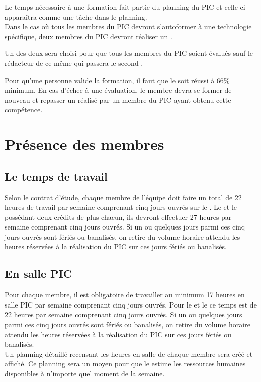 Le temps nécessaire à une formation fait partie du planning du PIC et celle-ci apparaîtra comme une tâche dans le planning. \\

Dans le cas où tous les membres du PIC devront s'autoformer à une technologie spécifique, deux membres du PIC devront réaliser un \QCM.

Un des deux \QCMCourt{} sera choisi pour que tous les membres du PIC soient évalués sauf le rédacteur de ce même \QCMCourt{} qui passera le second \QCMCourt.

Pour qu'une personne valide la formation, il faut que le \QCMCourt{} soit réussi à 66\% minimum. En cas d'échec à une évaluation, le membre devra se former de nouveau et repasser un \QCMCourt{} réalisé par un membre du PIC ayant obtenu cette compétence.

\section{Présence des membres}
\label{Présence des membres}

\subsection{Le temps de travail}
\label{temps_de_travail}
Selon le contrat d'étude, chaque membre de l'équipe doit faire un total de 22 heures de travail par semaine comprenant cinq jours ouvrés sur le \PICCourt. Le \CP{} et le \RQ{} possédant deux crédits de plus chacun, ils devront effectuer 27 heures par semaine comprenant cinq jours ouvrés. Si un ou quelques jours parmi ces cinq jours ouvrés sont fériés ou banalisés, on retire du volume horaire attendu les heures réservées à la réalisation du PIC sur ces jours fériés ou banalisés.

\subsection{En salle PIC}
\label{en_salle_pic}
Pour chaque membre, il est obligatoire de travailler au minimum 17 heures en salle PIC par semaine comprenant cinq jours ouvrés. Pour le \CP{} et le \RQ{} ce temps est de 22 heures par semaine comprenant cinq jours ouvrés. Si un ou quelques jours parmi ces cinq jours ouvrés sont fériés ou banalisés, on retire du volume horaire attendu les heures réservées à la réalisation du PIC sur ces jours fériés ou banalisés.\\

Un planning détaillé recensant les heures en salle de chaque membre sera créé et affiché.
Ce planning sera un moyen pour que le \CP{} estime les ressources humaines disponibles à n'importe quel moment de la semaine.

